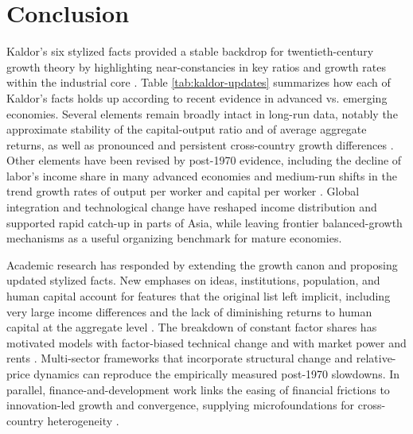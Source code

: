 \documentclass[\topdir/lecture\_notes.tex]{subfiles}
\begin{document}


\section{Conclusion}

Kaldor's six stylized facts provided a stable backdrop for twentieth-century growth theory by highlighting near-constancies in key ratios and growth rates within the industrial core \parencite{kaldor1957model,kaldor1961capital,jones2016facts}.
Table \ref{tab:kaldor-updates} summarizes how each of Kaldor's facts holds up according to recent evidence in advanced vs. emerging economies.
Several elements remain broadly intact in long-run data, notably the approximate stability of the capital-output ratio and of average aggregate returns, as well as pronounced and persistent cross-country growth differences \parencite{herrendorf2014growth,herrendorf2019kaldor,jorda2019rate,pritchett1997divergence,bolt2018rebasing}.
Other elements have been revised by post-1970 evidence, including the decline of labor's income share in many advanced economies and medium-run shifts in the trend growth rates of output per worker and capital per worker \parencite{karabarbounis2014global,elsby2013decline,imf2017weo,gordon2016rise,fernald2015productivity,herrendorf2014growth,byrneolinersichel2017}.
Global integration and technological change have reshaped income distribution and supported rapid catch-up in parts of Asia, while leaving frontier balanced-growth mechanisms as a useful organizing benchmark for mature economies\parencite{baldwin2016great,young1995tyranny,collinsbosworth1996,feenstrainklaartimmer2015pwt,solow1956contribution,kingrebelo1993,jones2016facts}.

Academic research has responded by extending the growth canon and proposing updated stylized facts.
New emphases on ideas, institutions, population, and human capital account for features that the original list left implicit, including very large income differences and the lack of diminishing returns to human capital at the aggregate level \parencite{jones2010new}.
The breakdown of constant factor shares has motivated models with factor-biased technical change and with market power and rents \parencite{acemoglu2002directed,acemoglu2003laborcapaugment,deloecker2020markups,barkai2020declining}.
Multi-sector frameworks that incorporate structural change and relative-price dynamics can reproduce the empirically measured post-1970 slowdowns\parencite{herrendorf2014growth,herrendorf2019kaldor,duernecker2021productivity}.
In parallel, finance-and-development work links the easing of financial frictions to innovation-led growth and convergence, supplying microfoundations for cross-country heterogeneity \parencite{aghion2018finance}.
\end{document}
